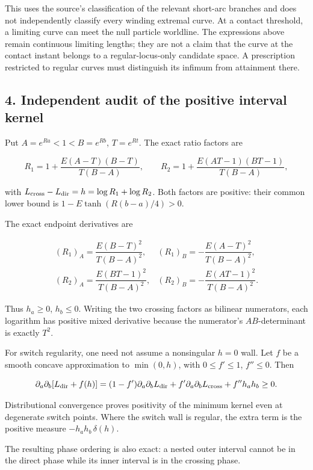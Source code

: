 \documentclass[11pt]{article}
\begin{document}
This uses the source's classification of the relevant short-arc branches
and does not independently classify every winding extremal curve. At a
contact threshold, a limiting curve can meet the null particle
worldline. The expressions above remain continuous limiting lengths;
they are not a claim that the curve at the contact instant belongs to a
regular-locus-only candidate space. A prescription restricted to regular
curves must distinguish its infimum from attainment there.

\subsection{4. Independent audit of the positive interval
kernel}\label{independent-audit-of-the-positive-interval-kernel}

Put \(A=e^{Ra}<1<B=e^{Rb}\), \(T=e^{Rt}\). The exact ratio factors are

\[
 R_1=1+\frac{E(A-T)(B-T)}{T(B-A)},\qquad
 R_2=1+\frac{E(AT-1)(BT-1)}{T(B-A)},
\]

with \(L_{\rm cross}-L_{\rm dir}=h=\log R_1+\log R_2\). Both factors are
positive: their common lower bound is \(1-E\tanh(R(b-a)/4)>0\).

The exact endpoint derivatives are

\[
 \begin{array}{ll}
 (R_1)_A=\dfrac{E(B-T)^2}{T(B-A)^2},&
 (R_1)_B=-\dfrac{E(A-T)^2}{T(B-A)^2},\\[6pt]
 (R_2)_A=\dfrac{E(BT-1)^2}{T(B-A)^2},&
 (R_2)_B=-\dfrac{E(AT-1)^2}{T(B-A)^2}.
 \end{array}
\]

Thus \(h_a\ge0\), \(h_b\le0\). Writing the two crossing factors as
bilinear numerators, each logarithm has positive mixed derivative
because the numerator's \(AB\)-determinant is exactly \(T^2\).

For switch regularity, one need not assume a nonsingular \(h=0\) wall.
Let \(f\) be a smooth concave approximation to \(\min(0,h)\), with
\(0\le f'\le1\), \(f''\le0\). Then

\[
 \partial_a\partial_b[L_{\rm dir}+f(h)]
 =(1-f')\partial_a\partial_bL_{\rm dir}
 +f'\partial_a\partial_bL_{\rm cross}
 +f''h_ah_b\ge0.
\]

Distributional convergence proves positivity of the minimum kernel even
at degenerate switch points. Where the switch wall is regular, the extra
term is the positive measure \(-h_ah_b\,\delta(h)\).

The resulting phase ordering is also exact: a nested outer interval
cannot be in the direct phase while its inner interval is in the
crossing phase.
\end{document}
